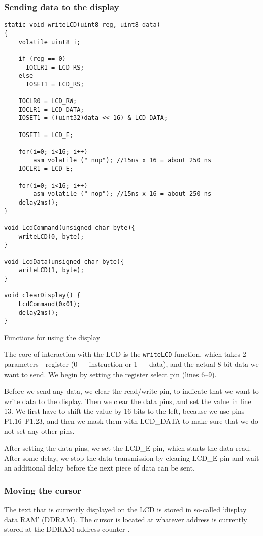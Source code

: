 \documentclass[10pt]{article}
\begin{document}
\subsubsection{Sending data to the display}

\begin{program}[H]
	\begin{lstlisting}
static void writeLCD(uint8 reg, uint8 data)
{
	volatile uint8 i;

	if (reg == 0)
	  IOCLR1 = LCD_RS;
	else
	  IOSET1 = LCD_RS;

    IOCLR0 = LCD_RW;
	IOCLR1 = LCD_DATA;
	IOSET1 = ((uint32)data << 16) & LCD_DATA;
	
	IOSET1 = LCD_E;

	for(i=0; i<16; i++)
        asm volatile (" nop"); //15ns x 16 = about 250 ns
	IOCLR1 = LCD_E;

	for(i=0; i<16; i++)
        asm volatile (" nop"); //15ns x 16 = about 250 ns
    delay2ms();
}

void LcdCommand(unsigned char byte){
    writeLCD(0, byte);
}

void LcdData(unsigned char byte){
    writeLCD(1, byte);
}

void clearDisplay() {
    LcdCommand(0x01); 
    delay2ms();
}
	\end{lstlisting}
	\caption{Functions for using the display}
	\label{lst:display-util-functions}
\end{program}

The core of interaction with the LCD is the \texttt{writeLCD} function, which takes 2 parameters - register (0 --- instruction or 1 --- data),
and the actual 8-bit data we want to send. 
We begin by setting the register select pin (lines 6--9).

Before we send any data, we clear the read/write pin, to indicate that we want to write data to the display.
Then we clear the data pins, and set the value in line 13.
We first have to shift the value by 16 bits to the left, because we use pins P1.16--P1.23, and then we mask them with LCD\_DATA to make sure that we do not set any other pins.

\pagebreak
After setting the data pins, we set the LCD\_E pin, which starts the data read. 
After some delay, we stop the data transmission by clearing LCD\_E pin and wait an additional delay before the next piece of data can be sent.

\subsubsection{Moving the cursor}
The text that is currently displayed on the LCD is stored in so-called `display data RAM' (DDRAM). 
The cursor is located at whatever address is currently stored at the DDRAM address counter \cite[p.21]{display-man}.
\end{document}

